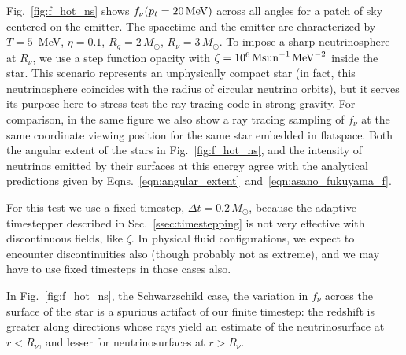 Fig.~\ref{fig:f_hot_ns} shows $f_\nu(p_t=20\,{\rm MeV})$ across all angles for
a patch of sky centered on the emitter. The spacetime and the emitter are
characterized by $T=5$~MeV, $\eta=0.1$, $R_g=2\,M_\odot$, $R_\nu=3\,M_\odot$.
To impose a sharp neutrinosphere at $R_\nu$, we use a step function opacity
with $\zeta=10^6\,{\rm Msun}^{-1}\,{\rm MeV}^{-2}$ inside the star.
This scenario represents an unphysically compact star (in fact, this
neutrinosphere coincides with the radius of circular neutrino orbits), but it
serves its purpose here to stress-test the ray tracing code in strong gravity.
For comparison, in the same figure we also show a ray tracing sampling of $f_\nu$
at the same coordinate viewing position for the same star embedded in flatspace.
Both the angular extent of the stars in Fig.~\ref{fig:f_hot_ns}, and the
intensity of neutrinos emitted by their surfaces at this energy agree
with the analytical predictions given by
Eqns.~\ref{eqn:angular_extent}~and~\ref{eqn:asano_fukuyama_f}.

For this test we use a fixed timestep, $\Delta t = 0.2\,M_\odot$,
because the adaptive timestepper described in Sec.~\ref{ssec:timestepping} is
not very effective with discontinuous fields, like $\zeta$. In physical
fluid configurations, we expect to encounter discontinuities also (though
probably not as extreme), and we may have to use fixed timesteps in those
cases also.

In Fig.~\ref{fig:f_hot_ns}, the Schwarzschild case, the variation in $f_\nu$
across the surface of the star is a spurious artifact of our finite timestep:
the redshift is greater along directions whose rays yield an estimate of the
neutrinosurface at $r<R_\nu$, and lesser for neutrinosurfaces at $r>R_\nu$.

